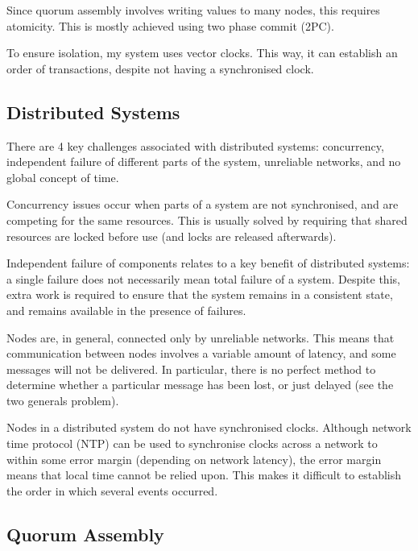 \documentclass[12pt,a4paper]{article}
\begin{document}
Since quorum assembly involves writing values to many nodes, this requires atomicity. This is mostly achieved using two phase commit (2PC).

To ensure isolation, my system uses vector clocks. This way, it can establish an order of transactions, despite not having a synchronised clock.

\subsection*{Distributed Systems}

There are 4 key challenges associated with distributed systems: concurrency, independent failure of different parts of the system, unreliable networks, and no global concept of time.

Concurrency issues occur when parts of a system are not synchronised, and are competing for the same resources. This is usually solved by requiring that shared resources are locked before use (and locks are released afterwards).

Independent failure of components relates to a key benefit of distributed systems: a single failure does not necessarily mean total failure of a system. Despite this, extra work is required to ensure that the system remains in a consistent state, and remains available in the presence of failures.

Nodes are, in general, connected only by unreliable networks. This means that communication between nodes involves a variable amount of latency, and some messages will not be delivered. In particular, there is no perfect method to determine whether a particular message has been lost, or just delayed (see the two generals problem).

Nodes in a distributed system do not have synchronised clocks. Although network time protocol (NTP) can be used to synchronise clocks across a network to within some error margin (depending on network latency), the error margin means that local time cannot be relied upon. This makes it difficult to establish the order in which several events occurred.


\subsection*{Quorum Assembly}
\end{document}
